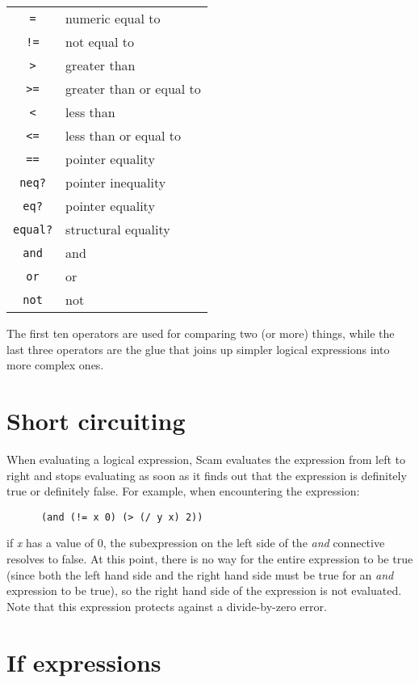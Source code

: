 \begin{tabular}{cl}
    {\tt =}     & numeric equal to \\
    {\tt !=}    & not equal to \\
    {\tt >}     & greater than \\
    {\tt >=}    & greater than or equal to \\
    {\tt <}     & less than \\
    {\tt <=}    & less than or equal to \\
    {\tt ==}    & pointer equality \\
    {\tt neq?}  & pointer inequality \\
    {\tt eq?}   & pointer equality \\
    {\tt equal?}& structural equality \\
    {\tt and}   & and \\
    {\tt or}    & or \\
    {\tt not}   & not \\
\end{tabular}

The first ten operators are used for comparing two  (or more) things,
while the last three operators are the glue that joins up simpler
logical expressions into more complex ones.

\section{Short circuiting}

When evaluating a logical expression,
Scam evaluates the expression from left to right and
stops evaluating as soon as it finds out that the expression
is definitely true or definitely false.
For example, when encountering the expression:

\begin{verbatim}
      (and (!= x 0) (> (/ y x) 2))
\end{verbatim}

if {\it x} has a value of 0, the subexpression on the left side of the
{\it and}
connective resolves to false. At this point, there is no way for the
entire expression to be true (since both the left hand side and the right
hand side must be true for an
{\it and}
expression to be true), so the right
hand side of the expression is not evaluated. Note that this expression
protects against a divide-by-zero error.

\section{If expressions}

